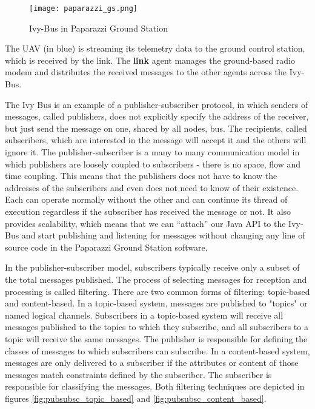 \begin{figure}[h!]
 \begin{center}
  \texttt{[image: paparazzi\_gs.png]}
 \end{center}
  \caption{Ivy-Bus in Paparazzi Ground Station\label{fig:paparazziGS}}
\end{figure}

The UAV (in blue) is streaming its telemetry data to the ground control station, which is received by the link. The \textbf{link} agent manages the ground-based radio modem and distributes the received messages to the other agents across the Ivy-Bus.

The Ivy Bus is an example of a publisher-subscriber protocol, in which senders of messages, called publishers, does not  explicitly specify the address of the receiver, but just send the message on one, shared by all nodes, bus. The recipients, called subscribers, which are interested in the message will accept it and the others will ignore it. The publisher-subscriber is a many to many communication model in which publishers are loosely coupled to subscribers - there is no space, flow and time coupling. This means that the publishers does not have to know the addresses of the subscribers and even does not need to know of their existence. Each can operate normally without the other and can continue its thread of execution regardless if the subscriber has received the message or not. It also provides scalability, which means that we can “attach” our Java API to the Ivy-Bus and start publishing and listening for messages without changing any line of source code in the Paparazzi Ground Station software.

In the publisher-subscriber model, subscribers typically receive only a subset of the total messages published. The process of selecting messages for reception and processing is called filtering. There are two common forms of filtering: topic-based and content-based.
In a topic-based system, messages are published to "topics" or named logical channels. Subscribers in a topic-based system will receive all messages published to the topics to which they subscribe, and all subscribers to a topic will receive the same messages. The publisher is responsible for defining the classes of messages to which subscribers can subscribe.
In a content-based system, messages are only delivered to a subscriber if the attributes or content of those messages match constraints defined by the subscriber. The subscriber is responsible for classifying the messages. Both filtering techniques are depicted in figures \ref{fig:pubsubsc_topic_based} and \ref{fig:pubsubsc_content_based}.

